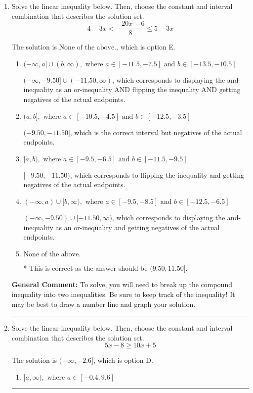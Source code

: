 \documentclass{extbook}[14pt]
\newcommand{\litem}[1]{\item #1

\rule{\textwidth}{0.4pt}}
\begin{document}
\begin{enumerate}\litem{
Solve the linear inequality below. Then, choose the constant and interval combination that describes the solution set.
\[ 4 - 3 x < \frac{-20 x - 6}{8} \leq 5 - 3 x \]

The solution is \( \text{None of the above.} \), which is option E.\begin{enumerate}[label=\Alph*.]
\item \( (-\infty, a] \cup (b, \infty), \text{ where } a \in [-11.5, -7.5] \text{ and } b \in [-13.5, -10.5] \)

$(-\infty, -9.50] \cup (-11.50, \infty)$, which corresponds to displaying the and-inequality as an or-inequality AND flipping the inequality AND getting negatives of the actual endpoints.
\item \( (a, b], \text{ where } a \in [-10.5, -4.5] \text{ and } b \in [-12.5, -3.5] \)

$(-9.50, -11.50]$, which is the correct interval but negatives of the actual endpoints.
\item \( [a, b), \text{ where } a \in [-9.5, -6.5] \text{ and } b \in [-11.5, -9.5] \)

$[-9.50, -11.50)$, which corresponds to flipping the inequality and getting negatives of the actual endpoints.
\item \( (-\infty, a) \cup [b, \infty), \text{ where } a \in [-9.5, -8.5] \text{ and } b \in [-12.5, -6.5] \)

$(-\infty, -9.50) \cup [-11.50, \infty)$, which corresponds to displaying the and-inequality as an or-inequality and getting negatives of the actual endpoints.
\item \( \text{None of the above.} \)

* This is correct as the answer should be $(9.50, 11.50]$.
\end{enumerate}

\textbf{General Comment:} To solve, you will need to break up the compound inequality into two inequalities. Be sure to keep track of the inequality! It may be best to draw a number line and graph your solution.
}
\litem{
Solve the linear inequality below. Then, choose the constant and interval combination that describes the solution set.
\[ 5x -8 \geq 10x + 5 \]

The solution is \( (-\infty, -2.6] \), which is option D.\begin{enumerate}[label=\Alph*.]
\item \( [a, \infty), \text{ where } a \in [-0.4, 9.6] \)


\end{enumerate}}
\end{enumerate}
\end{document}
